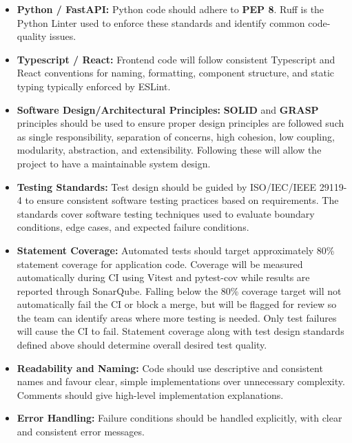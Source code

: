 \documentclass{article}
\begin{document}
\begin{itemize}
    \item \textbf{Python / FastAPI:} Python code should adhere to \textbf{PEP 8}.
          Ruff is the Python Linter used to enforce these standards and identify common code-quality issues.

    \item \textbf{Typescript / React:} Frontend code will follow consistent Typescript and React conventions
          for naming, formatting, component structure, and static typing typically enforced by ESLint.

    \item \textbf{Software Design/Architectural Principles:} \textbf{SOLID} and \textbf{GRASP} principles
          should be used to ensure proper design principles are followed such as single responsibility, separation of
          concerns, high cohesion, low coupling, modularity, abstraction, and extensibility. Following these will allow
          the project to have a maintainable system design.

    \item \textbf{Testing Standards:} Test design should be guided by ISO/IEC/IEEE 29119-4
          to ensure consistent software testing practices based on requirements. The standards cover software testing
          techniques used to evaluate boundary conditions, edge cases, and expected failure conditions.

    \item \textbf{Statement Coverage:} Automated tests should target approximately 80\% statement coverage for application code.
          Coverage will be measured automatically during CI using Vitest and pytest-cov while results are reported through SonarQube.
          Falling below the 80\% coverage target will not automatically fail the CI or block a merge, but will be flagged for 
          review so the team can identify areas where more testing is needed. Only test failures will cause the CI to fail.
          Statement coverage along with test design standards defined above should determine overall desired test quality.

    \item \textbf{Readability and Naming:} Code should use descriptive and consistent names and favour clear,
          simple implementations over unnecessary complexity. Comments should give high-level implementation explanations.

    \item \textbf{Error Handling:} Failure conditions should be handled explicitly, with clear and consistent error messages.

\end{itemize}
\end{document}
